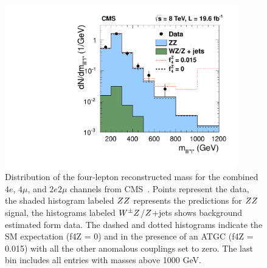 \begin{figure}[htbp]
  \begin{center}
  \includegraphics[width=0.9\textwidth]{figures/sss-inclboson-diboson-zzprod-zzinvmass.pdf}
  \caption{ Distribution of the four-lepton reconstructed mass for the combined $4e$, $4\mu$, and $2e2\mu$ channels from CMS~\cite{Khachatryan:2014dia}. Points represent the data, the shaded histogram labeled $ZZ$ represents the predictions for $ZZ$ signal, the histograms labeled $W^{\pm}Z$/$Z$+jets shows background estimated form data. The dashed and dotted histograms indicate the SM expectation (f4Z = 0) and in the presence of an ATGC (f4Z = 0.015) with all the other anomalous couplings set to zero. The last bin includes all entries with masses above 1000 GeV.
}
\label{fig:sss-inclboson-diboson-zzprod-zzinvmass}
\end{center}
\end{figure}

